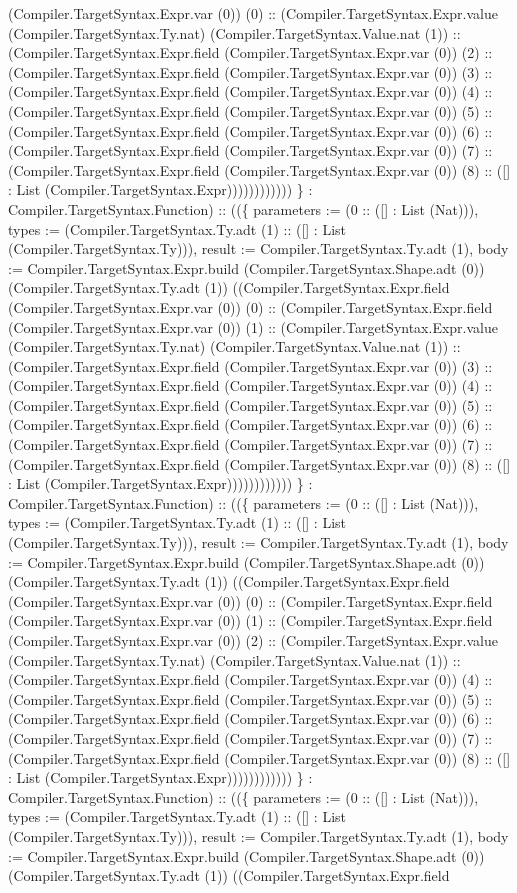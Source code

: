 \documentclass[11pt]{article}
\begin{document}
(Compiler.TargetSyntax.Expr.var (0)) (0) :: (Compiler.TargetSyntax.Expr.value (Compiler.TargetSyntax.Ty.nat) (Compiler.TargetSyntax.Value.nat (1)) :: (Compiler.TargetSyntax.Expr.field (Compiler.TargetSyntax.Expr.var (0)) (2) :: (Compiler.TargetSyntax.Expr.field (Compiler.TargetSyntax.Expr.var (0)) (3) :: (Compiler.TargetSyntax.Expr.field (Compiler.TargetSyntax.Expr.var (0)) (4) :: (Compiler.TargetSyntax.Expr.field (Compiler.TargetSyntax.Expr.var (0)) (5) :: (Compiler.TargetSyntax.Expr.field (Compiler.TargetSyntax.Expr.var (0)) (6) :: (Compiler.TargetSyntax.Expr.field (Compiler.TargetSyntax.Expr.var (0)) (7) :: (Compiler.TargetSyntax.Expr.field (Compiler.TargetSyntax.Expr.var (0)) (8) :: ([] : List (Compiler.TargetSyntax.Expr)))))))))))) \} : Compiler.TargetSyntax.Function) :: ((\{ parameters := (0 :: ([] : List (Nat))), types := (Compiler.TargetSyntax.Ty.adt (1) :: ([] : List (Compiler.TargetSyntax.Ty))), result := Compiler.TargetSyntax.Ty.adt (1), body := Compiler.TargetSyntax.Expr.build (Compiler.TargetSyntax.Shape.adt (0)) (Compiler.TargetSyntax.Ty.adt (1)) ((Compiler.TargetSyntax.Expr.field (Compiler.TargetSyntax.Expr.var (0)) (0) :: (Compiler.TargetSyntax.Expr.field (Compiler.TargetSyntax.Expr.var (0)) (1) :: (Compiler.TargetSyntax.Expr.value (Compiler.TargetSyntax.Ty.nat) (Compiler.TargetSyntax.Value.nat (1)) :: (Compiler.TargetSyntax.Expr.field (Compiler.TargetSyntax.Expr.var (0)) (3) :: (Compiler.TargetSyntax.Expr.field (Compiler.TargetSyntax.Expr.var (0)) (4) :: (Compiler.TargetSyntax.Expr.field (Compiler.TargetSyntax.Expr.var (0)) (5) :: (Compiler.TargetSyntax.Expr.field (Compiler.TargetSyntax.Expr.var (0)) (6) :: (Compiler.TargetSyntax.Expr.field (Compiler.TargetSyntax.Expr.var (0)) (7) :: (Compiler.TargetSyntax.Expr.field (Compiler.TargetSyntax.Expr.var (0)) (8) :: ([] : List (Compiler.TargetSyntax.Expr)))))))))))) \} : Compiler.TargetSyntax.Function) :: ((\{ parameters := (0 :: ([] : List (Nat))), types := (Compiler.TargetSyntax.Ty.adt (1) :: ([] : List (Compiler.TargetSyntax.Ty))), result := Compiler.TargetSyntax.Ty.adt (1), body := Compiler.TargetSyntax.Expr.build (Compiler.TargetSyntax.Shape.adt (0)) (Compiler.TargetSyntax.Ty.adt (1)) ((Compiler.TargetSyntax.Expr.field (Compiler.TargetSyntax.Expr.var (0)) (0) :: (Compiler.TargetSyntax.Expr.field (Compiler.TargetSyntax.Expr.var (0)) (1) :: (Compiler.TargetSyntax.Expr.field (Compiler.TargetSyntax.Expr.var (0)) (2) :: (Compiler.TargetSyntax.Expr.value (Compiler.TargetSyntax.Ty.nat) (Compiler.TargetSyntax.Value.nat (1)) :: (Compiler.TargetSyntax.Expr.field (Compiler.TargetSyntax.Expr.var (0)) (4) :: (Compiler.TargetSyntax.Expr.field (Compiler.TargetSyntax.Expr.var (0)) (5) :: (Compiler.TargetSyntax.Expr.field (Compiler.TargetSyntax.Expr.var (0)) (6) :: (Compiler.TargetSyntax.Expr.field (Compiler.TargetSyntax.Expr.var (0)) (7) :: (Compiler.TargetSyntax.Expr.field (Compiler.TargetSyntax.Expr.var (0)) (8) :: ([] : List (Compiler.TargetSyntax.Expr)))))))))))) \} : Compiler.TargetSyntax.Function) :: ((\{ parameters := (0 :: ([] : List (Nat))), types := (Compiler.TargetSyntax.Ty.adt (1) :: ([] : List (Compiler.TargetSyntax.Ty))), result := Compiler.TargetSyntax.Ty.adt (1), body := Compiler.TargetSyntax.Expr.build (Compiler.TargetSyntax.Shape.adt (0)) (Compiler.TargetSyntax.Ty.adt (1)) ((Compiler.TargetSyntax.Expr.field 
\end{document}

